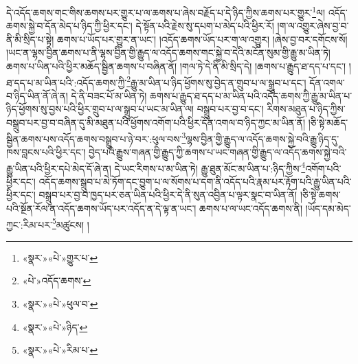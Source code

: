 དེ་འདོད་ཆགས་གང་གིས་ཆགས་པར་གྱུར་པ་ལ་ཆགས་པ་ཞེས་བརྗོད་པ་དེ་ཉིད་ཀྱིས་ཆགས་པར་གྱུར་\footnote{«སྣར་»«པེ་»གྱུར་པ་}ལ། འདོད་ཆགས་སྐྱེ་བ་དོན་མེད་པ་ཉིད་ཀྱི་ཕྱིར་དང་། དེ་སྟོན་པའི་རྗེས་སུ་དཔག་པ་མེད་པའི་ཕྱིར་རོ། །ག་ལ་འགྱུར་ཞེས་བྱ་བ་ནི་མི་སྲིད་པ་སྟེ། ཆགས་པ་ཡོད་པར་གྱུར་ན་ཡང་། །འདོད་ཆགས་ཡོད་པར་ག་ལ་འགྱུར། །ཞེས་བྱ་བར་དགོངས་སོ། །ཡང་ན་ལྷས་བྱིན་ཆགས་པ་ནི་ལྷས་བྱིན་གྱི་རྒྱུད་ལ་འདོད་ཆགས་གང་སྐྱེ་བ་དེའི་མངོན་སུམ་གྱི་རྒྱུ་མ་ཡིན་ཏེ། ཆགས་པ་ཡིན་པའི་ཕྱིར་མཆོད་སྦྱིན་ཆགས་པ་བཞིན་ནོ། །གལ་ཏེ་དེ་ནི་མི་སྲིད་དེ། །ཆགས་པ་རྒྱུད་ཐ་དད་པ་དང་། །ཐ་དད་པ་མ་ཡིན་པའི་:འདོད་ཆགས་ཀྱི་\footnote{«པེ་»འདོད་ཆགས་}རྒྱུ་མ་ཡིན་པ་ཉིད་ཕྱོགས་སུ་བྱེད་ན་གྲུབ་པ་ལ་སྒྲུབ་པ་དང་། དོན་འགལ་བ་ཉིད་ཡིན་ནོ་ཞེ་ན། དེ་ནི་བཟང་པོ་མ་ཡིན་ཏེ། ཆགས་པ་རྒྱུད་ཐ་དད་པ་མ་ཡིན་པའི་འདོད་ཆགས་ཀྱི་རྒྱུ་མ་ཡིན་པ་ཉིད་ཕྱོགས་སུ་བྱས་པའི་ཕྱིར་གྲུབ་པ་ལ་སྒྲུབ་པ་ཡང་མ་ཡིན་ལ། བསྒྲུབ་པར་བྱ་བ་དང་། རིགས་མཐུན་པ་ཉིད་ཀྱིས་བསྒྲུབ་པར་བྱ་བ་བཞིན་དུ་མི་མཐུན་པའི་ཕྱོགས་འགོག་པའི་ཕྱིར་དོན་འགལ་བ་ཉིད་ཀྱང་མ་ཡིན་ནོ། །ཅི་སྟེ་མཆོད་སྦྱིན་ཆགས་པས་འདོད་ཆགས་བསྒྲུབ་པ་ཉེ་བར་:ཕུལ་བས་\footnote{«སྣར་»«པེ་»ཕུལ་བ་}ལྷས་བྱིན་གྱི་རྒྱུད་ལ་འདོད་ཆགས་སྐྱེ་བའི་རྒྱུ་ཉིད་དུ་ཁས་བླངས་པའི་ཕྱིར་དང་། བྱེད་པའི་རྒྱུས་གཞན་གྱི་རྒྱུད་ཀྱི་ཆགས་པ་ཡང་གཞན་གྱི་རྒྱུད་ལ་འདོད་ཆགས་སྐྱེ་བའི་རྒྱུ་ཡིན་པའི་ཕྱིར་དཔེ་མེད་དོ་ཞེ་ན། དེ་ཡང་རིགས་པ་མ་ཡིན་ཏེ། རྒྱུ་ཐུན་མོང་མ་ཡིན་པ་:ཉིད་ཀྱིས་\footnote{«སྣར་»«པེ་»ཉིད་}འགོག་པའི་ཕྱིར་དང་། འདོད་ཆགས་སྒྲུབ་པ་མེ་ཏོག་དང་བྱུག་པ་ལ་སོགས་པ་དག་ནི་འདོད་པའི་རྣམ་པར་རྟོག་པའི་རྒྱུ་ཡིན་པའི་ཕྱིར་དང་། བསྒྲུབ་པར་བྱ་བ་ཁྱད་པར་ཅན་ཡིན་པའི་ཕྱིར་དེ་ནི་སུན་འབྱིན་པ་ལྟར་སྣང་བ་ཡིན་ནོ། །ཅི་སྟེ་ཆགས་པའི་སྔོན་རོལ་ན་འདོད་ཆགས་ཡོད་པར་འདོད་ན་དེ་ལྟ་ན་ཡང་། ཆགས་པ་ལ་ཡང་འདོད་ཆགས་ནི། །ཡོད་དམ་མེད་ཀྱང་:རིམ་པར་\footnote{«སྣར་»«པེ་»རིམ་པ་}མཚུངས། །
